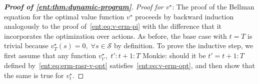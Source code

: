 \documentclass[twoside]{article}
\newcommand{\states}{\mathcal{S}}
\newcommand{\opt}{^\star}
\newcommand{\erm}[2]{\operatorname{ERM}_{#1}\left[#2\right]}
\newcommand{\monkie}[1]{{\color{teal} Monkie: #1}}
\theoremstyle{plain}
\theoremstyle{definition}
\theoremstyle{remark}
\begin{document}
\begin{proof}[\bf\em Proof of \cref{ent:thm:dynamic-program}]


{\em Proof for $v^\star$}: The proof of the Bellman equation for the optimal value function $v\opt$ proceeds by backward induction analogously to the proof of~\eqref{ent:eq:v-erm-pi} with the difference that it incorporates the optimization over actions. As before, the base case with $t = T$ is trivial because $v\opt_T(s) = 0,\;\forall s\in \states$ by definition. To prove the inductive step, we first assume that any function $v^\star_{t'},\;t':t+1{:}T$ \monkie{should it be $t'=t+1{:}T$} defined by~\eqref{ent:eq:erm-rasr-v-opt} satisfies~\eqref{ent:eq:v-erm-opt}, and then show that the same is true for $v^\star_t$. 


\end{proof}
\end{document}
